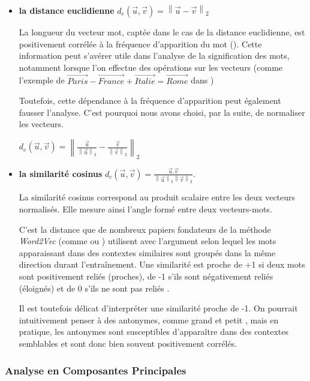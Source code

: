\documentclass[11pt,french,french]{article}
\begin{document}
\begin{itemize}
\item \textbf{la distance euclidienne} $ d_{e}(\vec{u},\vec{v}) = \left\| \vec{u} - \vec{v}  \right\|_2$

La longueur du vecteur mot, captée dans le cas de la distance euclidienne, est positivement corrélée à la fréquence d'apparition du mot (\cite{Schakel}). Cette information peut s'avérer utile dans l'analyse de la signification des mots, notamment lorsque l'on effectue des opérations sur les vecteurs (comme l'exemple de $\overrightarrow{Paris} - \overrightarrow{France} + \overrightarrow{Italie} = \overrightarrow{Rome}$ dans \cite{Mikolov})

Toutefois, cette dépendance à la fréquence d'apparition peut également fausser l'analyse. C'est pourquoi nous avons choisi, par la suite, de normaliser les vecteurs. 

$ d_{e}(\vec{u},\vec{v}) = \left\| \frac{\vec{u}}{\left\| \vec{u} \right\|_2} - \frac{\vec{v}}{\left\| \vec{v} \right\|_2}  \right\|_2$


\item \textbf{la similarité cosinus} $ d_{c}(\vec{u}, \vec{v}) = \frac{\vec{u}.\vec{v}}{\left\| \vec{u} \right\|_2  \left\| \vec{v} \right\|_2 }$.

La similarité cosinus correspond au produit scalaire entre les deux vecteurs normalisés. Elle mesure ainsi l'angle formé entre deux vecteurs-mots.

C'est la distance que de nombreux papiers fondateurs de la méthode \emph{Word2Vec} (comme \cite{Mikolov} ou \cite{Levy}) utilisent avec l'argument selon lequel les mots apparaissant dans des contextes similaires sont groupés dans la même direction durant l'entraînement. 
Une similarité est proche de +1 si deux mots sont positivement reliés (proches), de -1 s'ils sont négativement reliés (éloignés) et de 0 s'ils ne sont pas \og reliés \fg. 

Il est toutefois délicat d'interpréter une similarité proche de -1. On pourrait intuitivement penser à des antonymes, comme \og grand \fg et \og petit \fg, mais en pratique, les antonymes sont susceptibles d'apparaître dans des contextes semblables et sont donc bien souvent positivement corrélés. 

 
\end{itemize}

\hypertarget{analyse-en-composantes-principales}{%
\subsubsection{Analyse en Composantes
Principales}\label{analyse-en-composantes-principales}}
\end{document}
